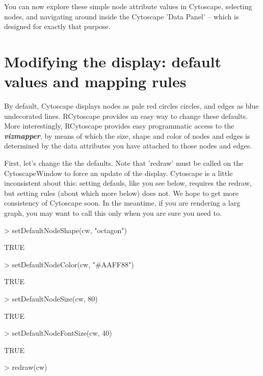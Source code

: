 \documentclass[12pt]{article}
\begin{document}
You can now explore these simple node attribute values in Cytoscape, selecting nodes, and navigating around inside the Cytoscape 'Data Panel' -- which is designed for exactly that purpose.


\section{Modifying the display:  default values and mapping rules}

By default, Cytoscape displays nodes as pale red circles circles, and edges as blue undecorated lines.  RCytoscape
provides an easy way to change these defaults.  More interestingly, RCytoscape provides easy programmatic access to the
\emph{\textbf{vizmapper}}, by means of which the size, shape and color of nodes and edges is determined by the data attributes you have attached to those nodes and edges. 

First, let's change the the defaults.  Note that 'redraw' must be called on the CytoscapeWindow to force an update of
the display.  Cytoscape is a little inconsistent about this:  setting
defauls, like you see below, requires the redraw, but setting rules
(about which more below) does not.  We hope to get more consistency of
Cytoscape soon.  In the meantime, if you are rendering a larg graph, you may want to call this only when you are sure you need to.

\begin{Schunk}
\begin{Sinput}
> setDefaultNodeShape(cw, "octagon")
\end{Sinput}
\begin{Soutput}
[1] TRUE
\end{Soutput}
\begin{Sinput}
> setDefaultNodeColor(cw, "#AAFF88")
\end{Sinput}
\begin{Soutput}
[1] TRUE
\end{Soutput}
\begin{Sinput}
> setDefaultNodeSize(cw, 80)
\end{Sinput}
\begin{Soutput}
[1] TRUE
\end{Soutput}
\begin{Sinput}
> setDefaultNodeFontSize(cw, 40)
\end{Sinput}
\begin{Soutput}
[1] TRUE
\end{Soutput}
\begin{Sinput}
> redraw(cw)
\end{Sinput}
\end{Schunk}
\end{document}
